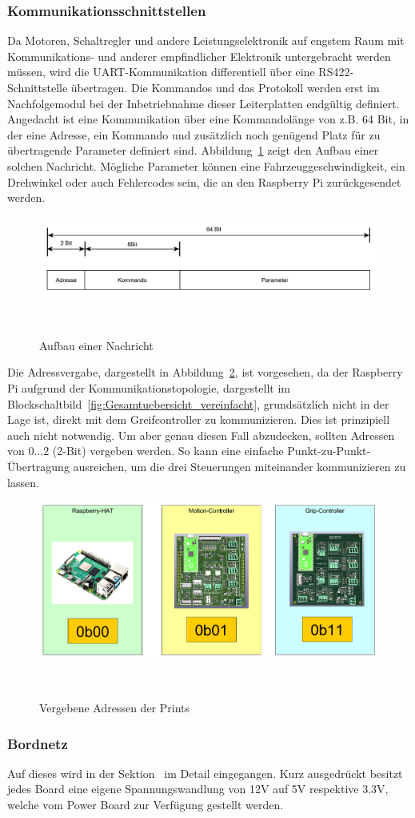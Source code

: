\documentclass[main.tex]{subfiles} %
\begin{document}
\subsubsection*{Kommunikationsschnittstellen}
Da Motoren, Schaltregler und andere Leistungselektronik auf engstem Raum mit
Kommunikations- und anderer empfindlicher Elektronik untergebracht werden müssen,
wird die UART-Kommunikation differentiell über eine RS422-Schnittstelle übertragen.
Die Kommandos und das Protokoll werden erst im Nachfolgemodul bei der Inbetriebnahme
dieser Leiterplatten endgültig definiert. Angedacht ist eine Kommunikation über
eine Kommandolänge von z.B. 64 Bit, in der eine Adresse, ein Kommando und zusätzlich
noch genügend Platz für zu übertragende Parameter definiert sind.  Abbildung~\ref{fig:Kommunikationsprotokoll}
zeigt den Aufbau einer solchen Nachricht.  Mögliche Parameter können eine Fahrzeuggeschwindigkeit,
ein Drehwinkel oder auch Fehlercodes sein, die an den Raspberry Pi zurückgesendet werden.

\begin{figure}[H]
      \centering
      \includegraphics[width = 0.75\linewidth]{fig_Steuerungstopologie_Gesamtuebersicht/Kommunikationsprotokoll.pdf}
      \caption{Aufbau einer Nachricht}~\label{fig:Kommunikationsprotokoll}
\end{figure}

Die Adressvergabe, dargestellt in Abbildung~\ref{fig:Adressvergabe}, ist
vorgesehen, da der Raspberry Pi aufgrund der Kommunikationstopologie,
dargestellt im Blockschaltbild~\ref{fig:Gesamtuebersicht_vereinfacht},
grundsätzlich nicht in der Lage ist, direkt mit dem Greifcontroller zu
kommunizieren. Dies ist prinzipiell auch nicht notwendig. Um aber genau diesen
Fall abzudecken, sollten Adressen von $0 \dots 2$ (2-Bit) vergeben werden. So
kann eine einfache Punkt-zu-Punkt-Übertragung ausreichen, um die drei
Steuerungen miteinander kommunizieren zu lassen.

\begin{figure}[H]
      \centering
      \includegraphics[width = 0.75\linewidth]{fig_Steuerungstopologie_Gesamtuebersicht/Adressvergabe.pdf}
      \caption{Vergebene Adressen der Prints}~\label{fig:Adressvergabe}
\end{figure}

\subsubsection*{Bordnetz}
Auf dieses wird in der Sektion~\label{sec:Boardnetz} im Detail eingegangen. Kurz ausgedrückt
besitzt jedes Board eine eigene Spannungswandlung von 12V auf 5V respektive 3.3V, welche vom
Power Board zur Verfügung gestellt werden.
\end{document}

